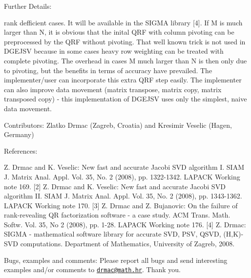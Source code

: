 \begin{DoxyParagraph}{Further Details\+: }
\begin{DoxyVerb}
  rank defficient cases. It will be available in the SIGMA library [4].
  If M is much larger than N, it is obvious that the inital QRF with
  column pivoting can be preprocessed by the QRF without pivoting. That
  well known trick is not used in DGEJSV because in some cases heavy row
  weighting can be treated with complete pivoting. The overhead in cases
  M much larger than N is then only due to pivoting, but the benefits in
  terms of accuracy have prevailed. The implementer/user can incorporate
  this extra QRF step easily. The implementer can also improve data movement
  (matrix transpose, matrix copy, matrix transposed copy) - this
  implementation of DGEJSV uses only the simplest, naive data movement.\end{DoxyVerb}
 
\end{DoxyParagraph}
\begin{DoxyParagraph}{Contributors\+: }
Zlatko Drmac (Zagreb, Croatia) and Kresimir Veselic (Hagen, Germany) 
\end{DoxyParagraph}
\begin{DoxyParagraph}{References\+: }
\begin{DoxyVerb} [1] Z. Drmac and K. Veselic: New fast and accurate Jacobi SVD algorithm I.
     SIAM J. Matrix Anal. Appl. Vol. 35, No. 2 (2008), pp. 1322-1342.
     LAPACK Working note 169.
 [2] Z. Drmac and K. Veselic: New fast and accurate Jacobi SVD algorithm II.
     SIAM J. Matrix Anal. Appl. Vol. 35, No. 2 (2008), pp. 1343-1362.
     LAPACK Working note 170.
 [3] Z. Drmac and Z. Bujanovic: On the failure of rank-revealing QR
     factorization software - a case study.
     ACM Trans. Math. Softw. Vol. 35, No 2 (2008), pp. 1-28.
     LAPACK Working note 176.
 [4] Z. Drmac: SIGMA - mathematical software library for accurate SVD, PSV,
     QSVD, (H,K)-SVD computations.
     Department of Mathematics, University of Zagreb, 2008.\end{DoxyVerb}
 
\end{DoxyParagraph}
\begin{DoxyParagraph}{Bugs, examples and comments\+: }
Please report all bugs and send interesting examples and/or comments to \href{mailto:drmac@math.hr}{\tt drmac@math.\+hr}. Thank you. 
\end{DoxyParagraph}
\hypertarget{group__doubleGEsing_gad8e0f1c83a78d3d4858eaaa88a1c5ab1}{}
